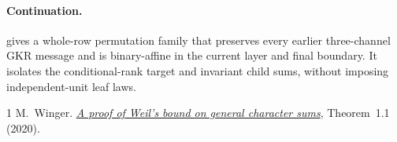 \documentclass[11pt]{article}
\begin{document}
\paragraph{Continuation.}  gives a whole-row permutation family that preserves every earlier three-channel GKR message and is binary-affine in the current layer and final boundary. It isolates the conditional-rank target and invariant child sums, without imposing independent-unit leaf laws.

\begin{thebibliography}{1}
 M.~Winger. \href{https://people.math.ethz.ch/~pinkri/Theses/2020-Bachelor-Moritz-Winger.pdf}{\emph{A proof of Weil's bound on general character sums}}, Theorem~1.1 (2020).
\end{thebibliography}
\end{document}
